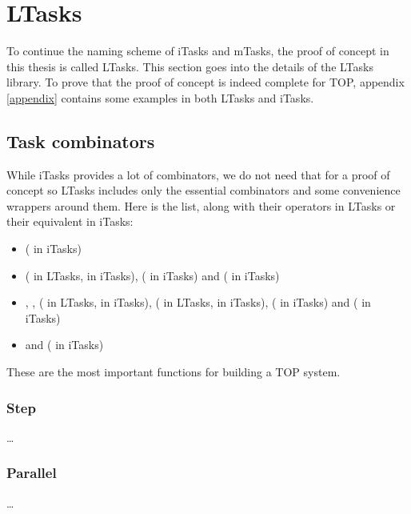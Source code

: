 \section{LTasks}\label{section-ltasks}
To continue the naming scheme of iTasks and mTasks, the proof of concept in this thesis is called LTasks. This section goes into the details of the LTasks library. To prove that the proof of concept is indeed complete for TOP, appendix \ref{appendix} contains some examples in both LTasks and iTasks.

\subsection{Task combinators}
While iTasks provides a lot of combinators, we do not need that for a proof of concept so LTasks includes only the essential combinators and some convenience wrappers around them. Here is the list, along with their operators in LTasks or their equivalent in iTasks:
\begin{itemize}
    \item {} ( in iTasks)
    \item {} (\lua{~} in LTasks, \clean{>>*} in iTasks),  (\clean{>>-} in iTasks) and  ( in iTasks)
    \item {}, ,  (\lua{&} in LTasks, \clean{-&&-} in iTasks),  (\lua{|} in LTasks, \clean{-||-} in iTasks),  (\clean{-||} in iTasks) and  (\clean{||-} in iTasks)
    \item {} and  ( in iTasks)
\end{itemize}

These are the most important functions for building a TOP system.

\subsubsection{Step}
\dots

\subsubsection{Parallel}
\dots

